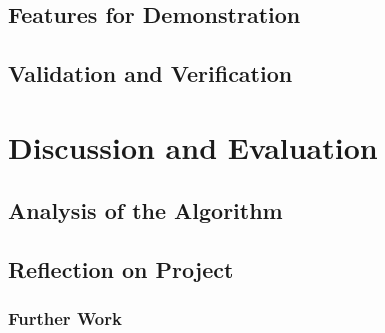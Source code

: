 \section{Features for Demonstration}

\section{Validation and Verification}

\chapter{Discussion and Evaluation}
\section{Analysis of the Algorithm}

\section{Reflection on Project}
\subsection{Further Work}
